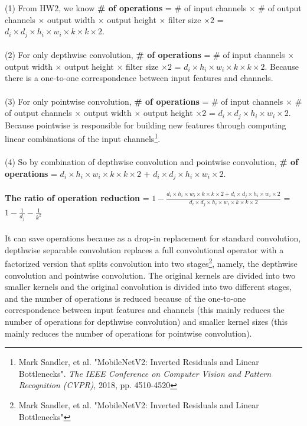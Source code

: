 \documentclass[11pt]{article}
\begin{document}
\begin{solution}
(1) From HW$2$, we know \textbf{\# of operations} = \# of input channels $\times$ \# of output channels $\times$ output width $\times$ output height $\times$ filter size $\times 2$ = $d_i \times d_j \times h_i \times w_i \times k \times k \times 2$.
\\
\\
(2) For only depthwise convolution, \textbf{\# of operations} = \# of input channels $\times$ output width $\times$ output height $\times$ filter size $\times 2$ = $d_i \times h_i \times w_i \times k \times k \times 2$. Because there is a one-to-one correspondence between input features and channels.
\\
\\
(3) For only pointwise convolution, \textbf{\# of operations} = \# of input channels $\times$ \# of output channels $\times$ output width $\times$ output height $\times 2$ = $d_i \times d_j \times h_i \times w_i \times 2$. Because pointwise is responsible for building new features through computing linear combinations of the input channels\footnote{Mark Sandler, et al. "MobileNetV2: Inverted Residuals and Linear Bottlenecks". \textit{The IEEE Conference on Computer Vision and Pattern Recognition (CVPR)}, 2018, pp. 4510-4520}.
\\
\\
(4) So by combination of depthwise convolution and pointwise convolution, \textbf{\# of operations} = $d_i \times h_i \times w_i \times k \times k \times 2$ + $d_i \times d_j \times h_i \times w_i \times 2$.
\\
\\
\textbf{The ratio of operation reduction} = $1 - \frac{d_i \times h_i \times w_i \times k \times k \times 2 + d_i \times d_j \times h_i \times w_i \times 2}{d_i \times d_j \times h_i \times w_i \times k \times k \times 2}$ = $1 - \frac{1}{d_j} - \frac{1}{k^2}$
\\
\\
It can save operations because as a drop-in replacement for standard convolution, depthwise separable convolution replaces a full convolutional operator with a factorized version that splits convolution into two stages\footnote{Mark Sandler, et al. "MobileNetV2: Inverted Residuals and Linear Bottlenecks"}, namely, the depthwise convolution and pointwise convolution.
The original kernels are divided into two smaller kernels and the original convolution is divided into two different stages, and the number of operations is reduced because of the one-to-one correspondence between input features and channels (this mainly reduces the number of operations for depthwise convolution) and smaller kernel sizes (this mainly reduces the number of operations for pointwise convolution).
\end{solution}
\end{document}
